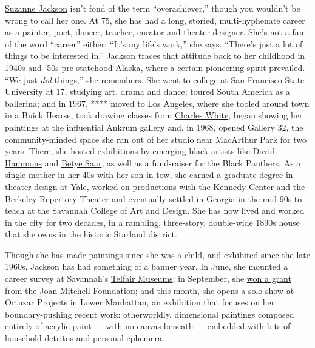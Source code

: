 \href{http://www.suzannefjackson.net/}{Suzanne Jackson} isn't fond of
the term ``overachiever,'' though you wouldn't be wrong to call her one.
At 75, she has had a long, storied, multi-hyphenate career as a painter,
poet, dancer, teacher, curator and theater designer. She's not a fan of
the word ``career'' either: ``It's my life's work,'' she says. ``There's
just a lot of things to be interested in.'' Jackson traces that attitude
back to her childhood in 1940s and '50s pre-statehood Alaska, where a
certain pioneering spirit prevailed. ``We just \emph{did} things,'' she
remembers. She went to college at San Francisco State University at 17,
studying art, drama and dance; toured South America as a ballerina; and
in 1967, **** moved to Los Angeles, where she tooled around town in a
Buick Hearse, took drawing classes from
\href{https://www.nytimes3xbfgragh.onion/2018/09/28/t-magazine/art/charles-white-moma-retrospective.html}{Charles
White}, began showing her paintings at the influential Ankrum gallery
and, in 1968, opened Gallery 32, the community-minded space she ran out
of her studio near MacArthur Park for two years. There, she hosted
exhibitions by emerging black artists like
\href{https://www.nytimes3xbfgragh.onion/2018/02/09/t-magazine/art/steve-cannon-david-hammons.html}{David
Hammons} and
\href{https://www.nytimes3xbfgragh.onion/2019/09/04/arts/design/betye-saar.html}{Betye
Saar}, as well as a fund-raiser for the Black Panthers. As a single
mother in her 40s with her son in tow, she earned a graduate degree in
theater design at Yale, worked on productions with the Kennedy Center
and the Berkeley Repertory Theater and eventually settled in Georgia in
the mid-90s to teach at the Savannah College of Art and Design. She has
now lived and worked in the city for two decades, in a rambling,
three-story, double-wide 1890s house that she owns in the historic
Starland district.

Though she has made paintings since she was a child, and exhibited since
the late 1960s, Jackson has had something of a banner year. In June, she
mounted a career survey at Savannah's
\href{https://www.telfair.org/}{Telfair Museums}; in September, she
\href{https://joanmitchellfoundation.org/artist-programs/artist-grants/painter-sculptors/2019/suzanne-jackson}{won
a grant} from the Joan Mitchell Foundation; and this month, she opens a
\href{http://www.ortuzarprojects.com/exhibitions/suzanne-jackson/works?view=slider}{solo
show} at Ortuzar Projects in Lower Manhattan, an exhibition that focuses
on her boundary-pushing recent work: otherworldly, dimensional paintings
composed entirely of acrylic paint --- with no canvas beneath ---
embedded with bits of household detritus and personal ephemera.

